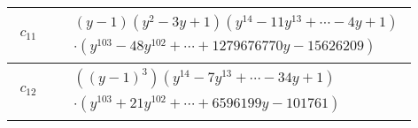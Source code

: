 \documentclass[1p]{elsarticle_modified}
\theoremstyle{definition}
\begin{document}
\begin{tabular}{m{50pt}|m{274pt}}
\hline $$\begin{aligned}c_{11}\end{aligned}$$&$\begin{aligned}
&(y-1)(y^2-3 y+1)(y^{14}-11 y^{13}+\cdots-4 y+1)\\
&\cdot(y^{103}-48 y^{102}+\cdots+1279676770 y-15626209)
\end{aligned}$\\
\hline $$\begin{aligned}c_{12}\end{aligned}$$&$\begin{aligned}
&((y-1)^3)(y^{14}-7 y^{13}+\cdots-34 y+1)\\
&\cdot(y^{103}+21 y^{102}+\cdots+6596199 y-101761)
\end{aligned}$\\
\hline
\end{tabular}
\vskip 2pc
\end{document}
